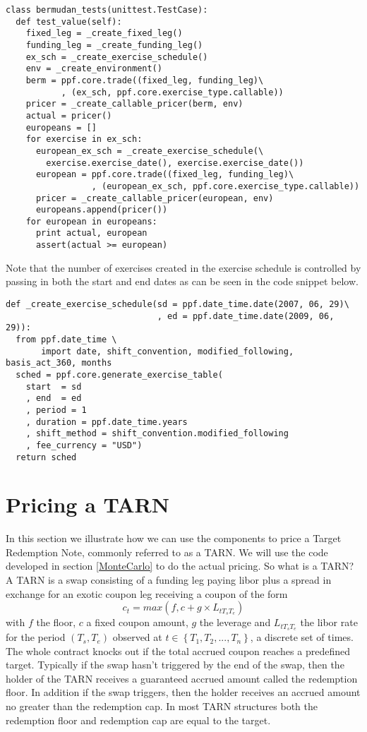\begin{verbatim}
class bermudan_tests(unittest.TestCase):
  def test_value(self):
    fixed_leg = _create_fixed_leg()
    funding_leg = _create_funding_leg()
    ex_sch = _create_exercise_schedule()
    env = _create_environment() 
    berm = ppf.core.trade((fixed_leg, funding_leg)\
           , (ex_sch, ppf.core.exercise_type.callable))   
    pricer = _create_callable_pricer(berm, env)
    actual = pricer()
    europeans = []
    for exercise in ex_sch:
      european_ex_sch = _create_exercise_schedule(\
        exercise.exercise_date(), exercise.exercise_date())
      european = ppf.core.trade((fixed_leg, funding_leg)\
                 , (european_ex_sch, ppf.core.exercise_type.callable))   
      pricer = _create_callable_pricer(european, env)
      europeans.append(pricer())
    for european in europeans:
      print actual, european
      assert(actual >= european)  
\end{verbatim}

Note that the number of exercises created in the exercise schedule is controlled by passing in both the start and end dates as can be seen in the code snippet below.

\begin{verbatim}
def _create_exercise_schedule(sd = ppf.date_time.date(2007, 06, 29)\
                              , ed = ppf.date_time.date(2009, 06, 29)):
  from ppf.date_time \
       import date, shift_convention, modified_following, basis_act_360, months
  sched = ppf.core.generate_exercise_table(
    start  = sd
    , end  = ed
    , period = 1
    , duration = ppf.date_time.years
    , shift_method = shift_convention.modified_following
    , fee_currency = "USD")
  return sched
\end{verbatim}

\section{Pricing a TARN} 

In this section we illustrate how we can use the components to price a Target Redemption Note, commonly referred to as a TARN. We will use the code developed in section \ref{MonteCarlo} to 
do the actual pricing. So what is a TARN? A TARN is a swap consisting of a funding leg paying libor plus a spread in exchange for an exotic coupon leg receiving a coupon of the form 
\begin{equation}
c_t = max\left(f, c+g \times L_{tT_sT_e}\right)
\end{equation}
with $f$ the floor, $c$ a fixed coupon amount, $g$ the leverage and $L_{tT_sT_e}$ the libor rate for the period $(T_s,T_e)$ observed at $t \in \left\{T_1, T_2, ..., T_n\right\}$, a discrete set of times. The whole contract knocks out if the total accrued coupon reaches a predefined target. Typically if the swap hasn't triggered by the end of the swap, then the holder of the TARN receives a guaranteed accrued amount called the redemption floor. In addition if the swap triggers, then the holder receives an accrued amount no greater than the redemption cap. In most TARN structures both the redemption floor and redemption cap are equal to the target. 

